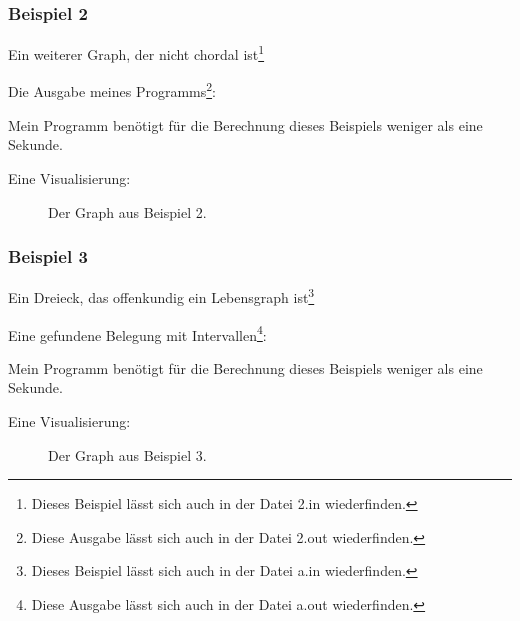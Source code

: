 \subsubsection*{Beispiel 2}
Ein weiterer Graph, der nicht chordal ist\footnote{Dieses Beispiel lässt sich auch in der Datei 2.in wiederfinden.}

{\small

}

Die Ausgabe meines Programms\footnote{Diese Ausgabe lässt sich auch in der Datei 2.out wiederfinden.}:

{\small

}

Mein Programm benötigt für die Berechnung dieses Beispiels weniger als eine Sekunde.

Eine Visualisierung:
\begin{center}
\begin{figure}[h]
\caption{Der Graph aus Beispiel 2.}
\end{figure}
\end{center}

\subsubsection*{Beispiel 3}
Ein Dreieck, das offenkundig ein Lebensgraph ist\footnote{Dieses Beispiel lässt sich auch in der Datei a.in wiederfinden.}

{\small

}

Eine gefundene Belegung mit Intervallen\footnote{Diese Ausgabe lässt sich auch in der Datei a.out wiederfinden.}:

{\small

}

Mein Programm benötigt für die Berechnung dieses Beispiels weniger als eine Sekunde.

Eine Visualisierung:
\begin{center}
\begin{figure}[h]
\caption{Der Graph aus Beispiel 3.}
\end{figure}
\end{center}

